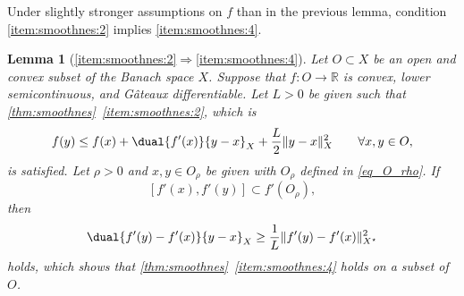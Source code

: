\documentclass[
	english
]{scrartcl}
\numberwithin{equation}{section} %
\DeclarePairedDelimiter\norm{\lVert}{\rVert}
\newcommand\R{\mathbb{R}}
\newcommand{\dualspace}{^\star}
\newtheorem{lemma}[theorem]{Lemma}
\begin{document}
Under slightly stronger assumptions on $f$ than in the previous lemma,  condition \ref{item:smoothnes:2} implies \ref{item:smoothnes:4}.

\begin{lemma}[\ref{item:smoothnes:2}\texorpdfstring{$\Rightarrow$}{=>}\ref{item:smoothnes:4}]
	\label{hatnochgefehlt}
	Let $O \subset X$ be an open and convex subset of the Banach space $X$.
	Suppose that $f \colon O \to \R$ is convex,  lower semicontinuous, and Gâteaux differentiable.
	Let $L>0$ be given such that \cref{thm:smoothnes}~\ref{item:smoothnes:2}, which is
	\begin{equation*}
		f(y) \le f(x) + \dual{f'(x)}{y - x}_X + \frac L2 \norm{y - x}_X^2
		\qquad\forall x,y \in O
		,
	\end{equation*}
	is satisfied.
	Let $\rho>0$ and $x,y\in O_\rho$ be given with $O_\rho$ defined in \eqref{eq_O_rho}.
	If
	\[
	 [f'(x), f'(y)] \subset f'(O_\rho),
	\]
	then
	\begin{equation}
		\label{eq:yet_another_inequality}
		\dual{f'(y) - f'(x)}{y - x}_X \ge \frac1L \norm{f'(y) - f'(x)}_{X\dualspace}^2
	\end{equation}
	holds,
	which shows that \cref{thm:smoothnes}~\ref{item:smoothnes:4} holds on a subset of $O$.
\end{lemma}
\end{document}
